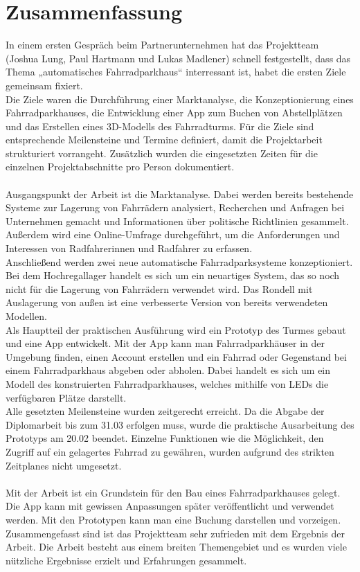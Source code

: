 \section{Zusammenfassung}

In einem ersten Gespräch beim Partnerunternehmen hat das Projektteam (Joshua Lung, Paul Hartmann und Lukas Madlener) schnell festgestellt, dass das Thema „automatisches Fahrradparkhaus“ interressant ist, habet die ersten Ziele gemeinsam fixiert. \\
Die Ziele waren die Durchführung einer Marktanalyse, die Konzeptionierung eines Fahrradparkhauses, die Entwicklung einer App zum Buchen von Abstellplätzen und das Erstellen eines 3D-Modells des Fahrradturms. Für die Ziele sind entsprechende Meilensteine und Termine definiert, damit die Projektarbeit strukturiert vorrangeht. Zusätzlich wurden die eingesetzten Zeiten für die einzelnen Projektabschnitte pro Person dokumentiert.\\ \\
Ausgangspunkt der Arbeit ist die Marktanalyse. Dabei werden bereits bestehende Systeme zur Lagerung von Fahrrädern analysiert, Recherchen und Anfragen bei Unternehmen gemacht und Informationen über politische Richtlinien gesammelt. Außerdem wird eine Online-Umfrage durchgeführt, um die Anforderungen und Interessen von Radfahrerinnen und Radfahrer zu erfassen.\\
Anschließend werden zwei neue automatische Fahrradparksysteme konzeptioniert. Bei dem Hochregallager handelt es sich um ein neuartiges System, das so noch nicht für die Lagerung von Fahrrädern verwendet wird. Das Rondell mit Auslagerung von außen ist eine verbesserte Version von bereits verwendeten Modellen.\\
Als Hauptteil der praktischen Ausführung wird ein Prototyp des Turmes gebaut und eine App entwickelt. Mit der App kann man Fahrradparkhäuser in der Umgebung finden, einen Account erstellen und ein Fahrrad oder Gegenstand bei einem Fahrradparkhaus abgeben oder abholen. Dabei handelt es sich um ein Modell des konstruierten Fahrradparkhauses, welches mithilfe von LEDs die verfügbaren Plätze darstellt. \\
Alle gesetzten Meilensteine wurden zeitgerecht erreicht. Da die Abgabe der Diplomarbeit bis zum 31.03 erfolgen muss, wurde die praktische Ausarbeitung des Prototyps am 20.02 beendet. Einzelne Funktionen wie die Möglichkeit, den Zugriff auf ein gelagertes Fahrrad zu gewähren, wurden aufgrund des strikten Zeitplanes nicht umgesetzt.\\ \\

Mit der Arbeit ist ein Grundstein für den Bau eines Fahrradparkhauses gelegt. Die App kann mit gewissen Anpassungen später veröffentlicht und verwendet werden. Mit den Prototypen kann man eine Buchung darstellen und vorzeigen.\\
Zusammengefasst sind ist das Projektteam sehr zufrieden mit dem Ergebnis der Arbeit. Die Arbeit besteht aus einem breiten Themengebiet und es wurden viele nützliche Ergebnisse erzielt und Erfahrungen gesammelt.\\

